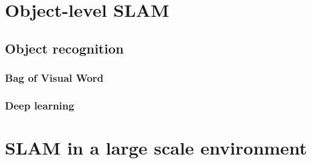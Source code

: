 \section{Object-level SLAM}
\subsection{Object recognition}

\subsubsection{Bag of Visual Word}
\subsubsection{Deep learning}



\section{SLAM in a large scale environment}


